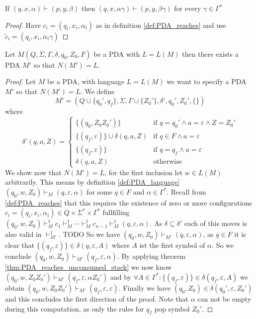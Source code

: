 \begin{theorem}\label{thm:PDA_reaches_unconsumed_stack}
  If $(q,x,\alpha)\vdash(p,y,\beta)$ then $(q,x,\alpha\gamma)\vdash(p,y,\beta\gamma)$ for
  every $\gamma\in\Gamma^*$
\end{theorem}
\begin{proof}
  Have $c_i = (q_i,x_i,\alpha_i)$ as in definition \ref{def:PDA_reaches} and use
  $\tilde{c}_i = (q_i,x_i,\alpha_i\gamma)$
\end{proof}
\begin{theorem}\label{thm:PDA_empty_stack_of_final_state}
  Let $M(Q,\Sigma,\Gamma,\delta,q_0,Z_0,F)$ be a PDA with $L=L(M)$ then there exists a PDA $M'$ so that $N(M')=L.$
\end{theorem}
\begin{proof}
  Let $M$ be a PDA, with language $L=L(M)$ we want to specify a PDA $M'$ so that
  $N(M')=L$. We define
  \[
  M' =(Q\cup\{q_0',q_f\},\Sigma,\Gamma\cup\{Z_0'\},\delta',q_0',Z_0',\{\})
  \]
  where
  \[
  \delta'(q,a,Z) =
  \begin{cases}
    \{(q_0,Z_0Z_0')\} & \text{if } q=q_0'\land a=\varepsilon \land Z=Z_0' \\
    \{(q_f,\varepsilon)\}\cup\delta(q,a,Z)  & \text{if } q\in F\land a=\varepsilon \\
    \{(q_f,\varepsilon)\} & \text{if } q=q_f \land a=\varepsilon \\
    \delta(q,a,Z) & \text{otherwise}
  \end{cases}
  \]
  We show now that $N(M')=L$, for the first inclusion let $w\in L(M)$ arbitrarily.
  This means by definition
  \ref{def:PDA_language} $(q_0,w,Z_0)\vdash_M(q,\varepsilon,\alpha)$ for some $q\in F$ and
  $\alpha\in\Gamma^*$. Recall from \ref{def:PDA_reaches} that this requires the existence
  of zero or more configurations $c_i=(q_i,x_i,\alpha_i)\in Q\times\Sigma^*\times\Gamma^*$
  fullfilling
  $(q_0,w,Z_0)\vdash^1_M c_1\vdash^1_M\cdots\vdash^1_M c_{n-1}\vdash^1_M(q,\varepsilon,\alpha)$.
  As $\delta\subseteq\delta'$ each of this moves is also valid in $\vdash^1_{M'}$. TODO
  So we have $(q_0,w,Z_0)\vdash_{M'}(q,\varepsilon,\alpha)$, as $q\in F$ it is clear that
  $\{(q_f,\varepsilon)\}\in \delta(q,\varepsilon,A)$ where $A$ ist the first symbol of $\alpha$.
  So we conclude  $(q_0,w,Z_0)\vdash_{M'}(q_f,\varepsilon,\alpha)$.
  By applying theorem \ref{thm:PDA_reaches_unconsumed_stack} we now know
  $(q_0,w,Z_0Z_0')\vdash_{M'}(q_f,\varepsilon,\alpha Z_0')$
  and by $\forall A\in\Gamma^*:\{(q_f,\varepsilon)\}\in\delta(q_f,\varepsilon,A)$ we obtain
  $(q_0,w,Z_0Z_0')\vdash_{M'}(q_f,\varepsilon,\varepsilon)$. Finally we have
  $(q_0,Z_0)\in\delta(q_0',\varepsilon,Z_0')$ and this concludes the first direction of
  the proof. Note that $\alpha$ can not be empty during this computation, as only the rules
  for $q_f$ pop symbol $Z_0'$.

  


\end{proof}

